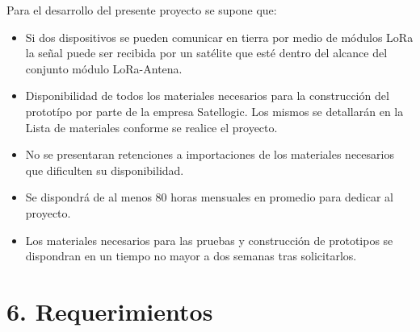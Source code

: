 \documentclass[
11pt, %
codirector, %
]{charter}
\begin{document}
Para el desarrollo del presente proyecto se supone que:

\begin{itemize}
	\item Si dos dispositivos se pueden comunicar en tierra por medio de módulos LoRa la señal puede ser recibida por un satélite que esté dentro del alcance del conjunto módulo LoRa-Antena.
	\item Disponibilidad de todos los materiales necesarios para la construcción del prototípo por parte de la empresa Satellogic. Los mismos se detallarán en la Lista de materiales conforme se realice el proyecto.
	\item No se presentaran retenciones a importaciones de los materiales necesarios que dificulten su disponibilidad.
	\item Se dispondrá de al menos 80 horas mensuales en promedio para dedicar al proyecto.
	\item Los materiales necesarios para las pruebas y construcción de prototipos se dispondran en un tiempo no mayor a dos semanas tras solicitarlos.
\end{itemize}

\section{6. Requerimientos}
\label{sec:requerimientos}
\end{document}
